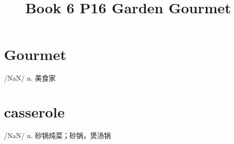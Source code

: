 \documentclass[a4paper,12pt]{article}
\begin{document}
\title{Book 6 P16 Garden Gourmet}
\maketitle

\section{Gourmet}
/NaN/ n. 美食家

\section{casserole}
/NaN/ n. 砂锅炖菜；砂锅，煲汤锅
\end{document}
